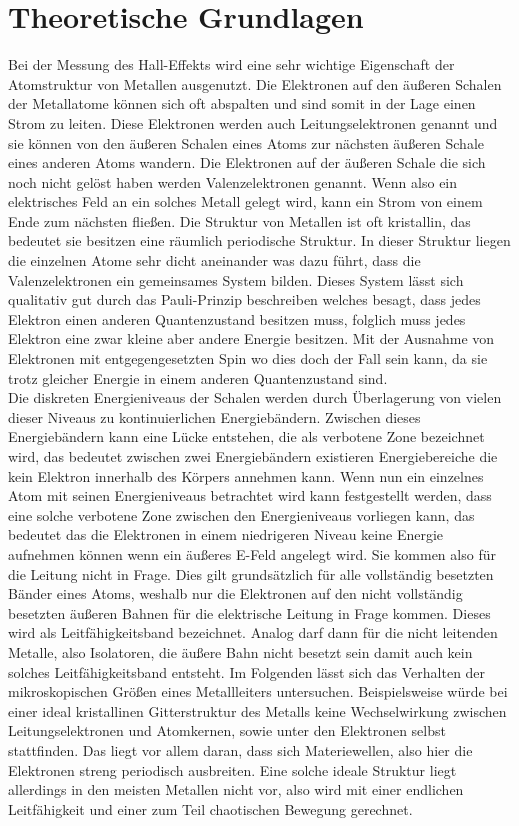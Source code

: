\section{Theoretische Grundlagen}
\label{sec:theo}
Bei der Messung des Hall-Effekts wird eine sehr wichtige Eigenschaft der Atomstruktur von Metallen ausgenutzt. %
Die Elektronen auf den äußeren Schalen der Metallatome können sich oft abspalten und sind somit in der Lage
einen Strom zu leiten. Diese Elektronen werden auch Leitungselektronen genannt und sie können von den äußeren Schalen
eines Atoms zur nächsten äußeren Schale eines anderen Atoms wandern. Die Elektronen auf der äußeren Schale die sich noch nicht gelöst haben werden Valenzelektronen
genannt. Wenn also ein elektrisches Feld an ein solches Metall gelegt wird, kann ein Strom von einem Ende zum nächsten fließen.
Die Struktur von Metallen ist oft kristallin, das bedeutet sie besitzen eine räumlich periodische Struktur. In dieser Struktur liegen die einzelnen Atome sehr dicht aneinander 
was dazu führt, dass die Valenzelektronen ein gemeinsames System bilden. Dieses System lässt sich qualitativ gut durch das Pauli-Prinzip beschreiben welches besagt, dass
jedes Elektron einen anderen Quantenzustand besitzen muss, folglich muss jedes Elektron eine zwar kleine aber andere Energie besitzen. Mit der Ausnahme von Elektronen
mit entgegengesetzten Spin wo dies doch der Fall sein kann, da sie trotz gleicher Energie in einem anderen Quantenzustand sind. \\
Die diskreten Energieniveaus der Schalen werden durch Überlagerung von vielen dieser Niveaus zu kontinuierlichen Energiebändern. Zwischen dieses Energiebändern kann eine Lücke entstehen, die 
als verbotene Zone bezeichnet wird, das bedeutet zwischen zwei Energiebändern existieren Energiebereiche die kein Elektron innerhalb des Körpers annehmen kann.
Wenn nun ein einzelnes Atom mit seinen Energieniveaus betrachtet wird kann festgestellt werden, dass eine solche verbotene Zone zwischen den Energieniveaus vorliegen kann, das bedeutet
das die Elektronen in einem niedrigeren Niveau keine Energie aufnehmen können wenn ein äußeres E-Feld angelegt wird. Sie kommen also für die Leitung nicht in Frage. 
Dies gilt grundsätzlich für alle vollständig besetzten Bänder eines Atoms, weshalb nur die Elektronen auf den nicht vollständig
besetzten äußeren Bahnen für die elektrische Leitung in Frage kommen. Dieses wird als Leitfähigkeitsband bezeichnet.
Analog darf dann für die nicht leitenden Metalle, also Isolatoren, die äußere Bahn nicht besetzt sein damit auch kein solches Leitfähigkeitsband entsteht.
Im Folgenden lässt sich das Verhalten der mikroskopischen Größen eines Metallleiters untersuchen.
Beispielsweise würde bei einer ideal kristallinen Gitterstruktur des Metalls keine Wechselwirkung zwischen Leitungselektronen und Atomkernen, sowie unter den Elektronen
selbst stattfinden. Das liegt vor allem daran, dass sich Materiewellen, also hier die Elektronen streng periodisch ausbreiten. 
Eine solche ideale Struktur liegt allerdings in den meisten Metallen nicht vor, also wird mit einer endlichen Leitfähigkeit und einer zum Teil chaotischen Bewegung gerechnet.

